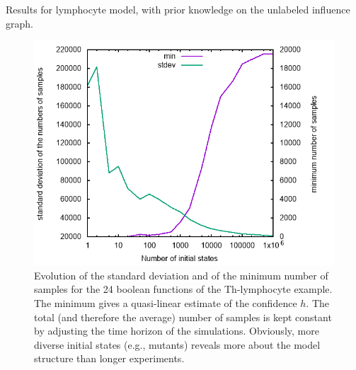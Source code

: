\documentclass{llncs}
\begin{document}
\begin{listfig}
	
	\caption{Results for lymphocyte model, with prior knowledge on the unlabeled influence graph.\label{hints.res}}
\end{listfig}

\begin{figure}[htb]
   \includegraphics[width=\textwidth]{statistics/statistics.png}
   \caption{Evolution of the standard deviation and of the minimum number of
   samples for the 24 boolean functions of the Th-lymphocyte example. The
minimum gives a quasi-linear estimate of the confidence $h$. The total (and
therefore the average) number of samples is kept constant by adjusting the
time horizon of the simulations. Obviously, more diverse initial states (e.g.,
mutants) reveals more about the model structure than longer experiments.}%
\label{fig:statistics}
\end{figure}
\end{document}
